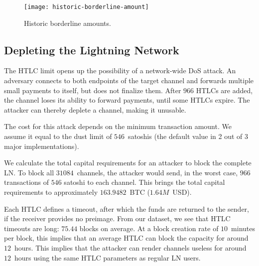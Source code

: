 \begin{figure}[tb]
	\centering
	\texttt{[image: historic-borderline-amount]}
	\caption{Historic borderline amounts.\label{fig:historic-borderline-amount}}
\end{figure}



\subsection{Depleting the Lightning Network}

The HTLC limit opens up the possibility of a network-wide DoS attack.
An adversary connects to both endpoints of the target channel and forwards multiple small payments to itself, 
but does not finalize them.
After $966$ HTLCs are added, the channel loses its ability to forward payments, until some HTLCs expire. 
The attacker can thereby deplete a channel, making it unusable.

The cost for this attack depends on the minimum transaction amount.
We assume it equal to the dust limit of $546$~satoshis (the default value in 2 out of 3 major implementations).

We calculate the total capital requirements for an attacker to block the complete LN.
To block all $31084$~channels, the attacker would send, in the worst case, $966$ transactions of $546$ satoshi to each channel.
This brings the total capital requirements to approximately $163.9482$~BTC ($1.64M$~USD).

Each HTLC defines a timeout, after which the funds are returned to the sender, if the receiver provides no preimage.
From our dataset, we see that HTLC timeouts are long: $75.44$ blocks on average.
At a block creation rate of $10$~minutes per block, this implies that an average HTLC can block the capacity for around $12$~hours.
This implies that the attacker can render channels useless for around $12$~hours using the same HTLC parameters as regular LN users.


